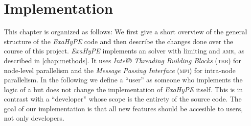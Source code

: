 \newcommand{\softwareName}[1]{\textit{#1}}
\newcommand{\exahype}{\softwareName{ExaHyPE}}
\newcommand{\peano}{\softwareName{Peano}}
\newcommand{\className}[1]{\texttt{#1}}
\newcommand{\funName}[1]{\textsf{#1}}
\newcommand{\fileName}[1]{\textbf{#1}}
\newcommand{\varName}[1]{\enquote{#1}}

\newcommand{\cpp}{C\texttt{++}}
\newcommand{\tbb}{\textsc{tbb}}
\newcommand{\mpi}{\textsc{mpi}}

\chapter{Implementation}\label{chap:implementation}
This chapter is organized as follows:
We first give a short overview of the general structure of the \exahype{} code and then describe the changes done over the course of this project.
\exahype{} implements an \aderdg{} solver with \muscl{} limiting and \textsc{amr}, as described in \cref{chap:methods}.
It uses \softwareName{Intel® Threading Building Blocks} (\tbb{}) for node-level parallelism and the \softwareName{Message Passing Interface} (\mpi{}) for intra-node parallelism. 
In the following we define a \enquote{user} as someone who implements the logic of a \pde{} but does not change the implementation of \exahype{} itself.
This is in contrast with a \enquote{developer} whose scope is the entirety of the source code.
The goal of our implementation is that all new features should be accesible to users, not only developers.

